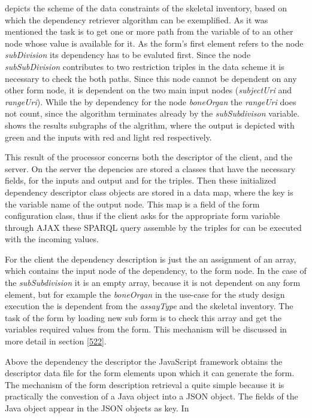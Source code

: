  depicts the scheme of the data constraints of the skeletal inventory, based on which the dependency retriever algorithm can be exemplified. As it was mentioned the task is to get one or more path from the variable of to an other node whose value is available for it.  As the form's first element refers to the node \textit{subDivision} its dependency has to be evaluted first. Since the node \textit{subSubDivision} contributes to two restriction triples in the data scheme it is necessary to check the both paths. Since this node cannot be dependent on any other form node, it is dependent on the two main input nodes (\textit{subjectUri} and \textit{rangeUri}). While the by dependency for the node \textit{boneOrgan} the \textit{rangeUri}
does not count, since the algorithm terminates already by the \textit{subSubdivison} variable.  shows the results subgraphs of the algrithm, where the output is depicted with green and the inputs with red and light red respectively.



This result of the processor concerns both the descriptor of the client, and the server. On the server the depencies are stored a classes that have the necessary fields, for the inputs and output and for the triples. Then these initialized dependency descriptor class objects are stored in a data map, where the key is the variable name of the output node. This map is a field of the form configuration class, thus if the client asks for the appropriate form variable through AJAX these SPARQL query assemble by the triples for can be executed with the incoming values.


For the client the dependency description is just the an assignment of an array, which contains the input node of the dependency, to the form node. In the case of the \textit{subSubdivision} it is an empty array, because it is not dependent on any form element, but for example the \textit{boneOrgan} in the use-case for the study design execution the is dependent from the \textit{assayType} and the skeletal inventory. The task of the form by loading new sub form is to check this array and get the variables required values from the form. This mechanism will be discussed in more detail in section \ref{522}. 

Above the dependency the descriptor the JavaScript framework obtains the descriptor data file for the form elements upon which it can generate the form. The mechanism of the form description retrieval a quite simple because it is practically the convestion of a Java object into a JSON object. The fields of the Java object appear in the JSON objects as key. In 


